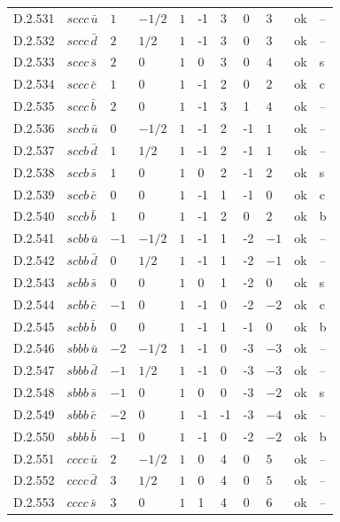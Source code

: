 {\begin{longtable}{@{}llllllllll>{\raggedright\arraybackslash}p{2.0cm}@{}}
D.2.531 & $sccc\,\bar{u}$ & $1$ & $-1/2$ & $1$ & -1 & 3 & 0 & $3$ & ok & -- \\
D.2.532 & $sccc\,\bar{d}$ & $2$ & $1/2$ & $1$ & -1 & 3 & 0 & $3$ & ok & -- \\
D.2.533 & $sccc\,\bar{s}$ & $2$ & $0$ & $1$ & 0 & 3 & 0 & $4$ & ok & s \\
D.2.534 & $sccc\,\bar{c}$ & $1$ & $0$ & $1$ & -1 & 2 & 0 & $2$ & ok & c \\
D.2.535 & $sccc\,\bar{b}$ & $2$ & $0$ & $1$ & -1 & 3 & 1 & $4$ & ok & -- \\
D.2.536 & $sccb\,\bar{u}$ & $0$ & $-1/2$ & $1$ & -1 & 2 & -1 & $1$ & ok & -- \\
D.2.537 & $sccb\,\bar{d}$ & $1$ & $1/2$ & $1$ & -1 & 2 & -1 & $1$ & ok & -- \\
D.2.538 & $sccb\,\bar{s}$ & $1$ & $0$ & $1$ & 0 & 2 & -1 & $2$ & ok & s \\
D.2.539 & $sccb\,\bar{c}$ & $0$ & $0$ & $1$ & -1 & 1 & -1 & $0$ & ok & c \\
D.2.540 & $sccb\,\bar{b}$ & $1$ & $0$ & $1$ & -1 & 2 & 0 & $2$ & ok & b \\
D.2.541 & $scbb\,\bar{u}$ & $-1$ & $-1/2$ & $1$ & -1 & 1 & -2 & $-1$ & ok & -- \\
D.2.542 & $scbb\,\bar{d}$ & $0$ & $1/2$ & $1$ & -1 & 1 & -2 & $-1$ & ok & -- \\
D.2.543 & $scbb\,\bar{s}$ & $0$ & $0$ & $1$ & 0 & 1 & -2 & $0$ & ok & s \\
D.2.544 & $scbb\,\bar{c}$ & $-1$ & $0$ & $1$ & -1 & 0 & -2 & $-2$ & ok & c \\
D.2.545 & $scbb\,\bar{b}$ & $0$ & $0$ & $1$ & -1 & 1 & -1 & $0$ & ok & b \\
D.2.546 & $sbbb\,\bar{u}$ & $-2$ & $-1/2$ & $1$ & -1 & 0 & -3 & $-3$ & ok & -- \\
D.2.547 & $sbbb\,\bar{d}$ & $-1$ & $1/2$ & $1$ & -1 & 0 & -3 & $-3$ & ok & -- \\
D.2.548 & $sbbb\,\bar{s}$ & $-1$ & $0$ & $1$ & 0 & 0 & -3 & $-2$ & ok & s \\
D.2.549 & $sbbb\,\bar{c}$ & $-2$ & $0$ & $1$ & -1 & -1 & -3 & $-4$ & ok & -- \\
D.2.550 & $sbbb\,\bar{b}$ & $-1$ & $0$ & $1$ & -1 & 0 & -2 & $-2$ & ok & b \\
D.2.551 & $cccc\,\bar{u}$ & $2$ & $-1/2$ & $1$ & 0 & 4 & 0 & $5$ & ok & -- \\
D.2.552 & $cccc\,\bar{d}$ & $3$ & $1/2$ & $1$ & 0 & 4 & 0 & $5$ & ok & -- \\
D.2.553 & $cccc\,\bar{s}$ & $3$ & $0$ & $1$ & 1 & 4 & 0 & $6$ & ok & -- \\

\end{longtable}}

